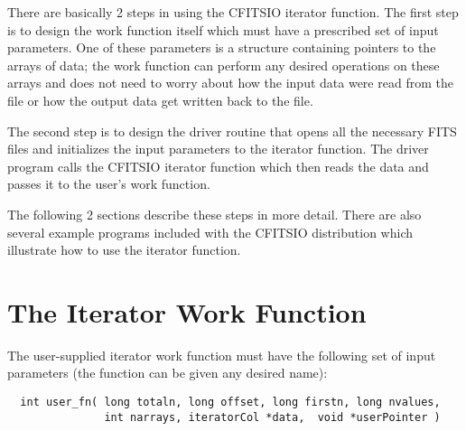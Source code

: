 \documentclass[11pt]{book}
\begin{document}
There are basically 2 steps in using the CFITSIO iterator function.
The first step is to design the work function itself which must have a
prescribed set of input parameters.  One of these parameters is a
structure containing pointers to the arrays of data; the work function
can perform any desired operations on these arrays and does not need to
worry about how the input data were read from the file or how the
output data get written back to the file.

The second step is to design the driver routine that opens all the
necessary FITS files and initializes  the input parameters to the
iterator function.  The driver program calls the CFITSIO iterator
function which then reads the data and passes it to the user's work
function.

The following 2 sections describe these steps in more detail.  There
are also several example programs included with the CFITSIO
distribution which illustrate how to use the iterator function.


\section{The Iterator Work Function}

The user-supplied iterator work function must have the following set of
input parameters (the function can be given any desired name):


\begin{verbatim}
  int user_fn( long totaln, long offset, long firstn, long nvalues,
               int narrays, iteratorCol *data,  void *userPointer )
\end{verbatim}
\end{document}
